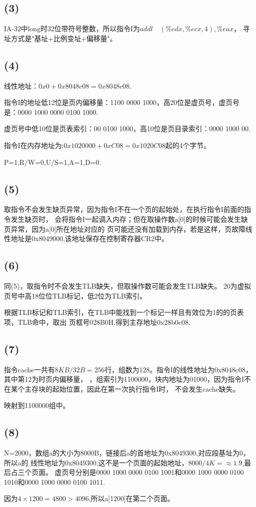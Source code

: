 \documentclass{article}
\begin{document}
\subsection*{(3)}
IA-32中long时32位带符号整数，所以指令I为$addl \quad (\%edx,\%ecx,4), \%eax$，
寻址方式是"基址+比例变址+偏移量"。
\subsection*{(4)}
线性地址：$0x0+0x8048c08=0x8048c08$.

指令I的地址低12位是页内偏移量：1100 0000 1000，高20位是虚页号，虚页号是：0000 1000 0000 0100 1000.

虚页号中低10位是页表索引：00 0100 1000，高10位是页目录索引：0000 1000 00.

指令I在内存地址为:$0x1020000+0xC08=0x1020C08$起的4个字节。

P=1,R/W=0,U/S=1,A=1,D=0.
\subsection*{(5)}
取指令不会发生缺页异常，因为指令I不在一个页的起始处，在执行指令I前面的指令发生缺页时，
会将指令I一起调入内存；但在取操作数a[0]的时候可能会发生缺页异常，因为a[0]所在地址对应的
页可能还没有加载到内存，若是这样，页故障线性地址是0x8049000,该地址保存在控制寄存器CR2中。
\subsection*{(6)}
同(5)，取指令时不会发生TLB缺失，但取操作数可能会发生TLB缺失。
20为虚拟页号中高18位位TLB标记，低2位为TLB索引。

根据TLB标记和TLB索引，在TLB中能找到一个标记一样且有效位为1的的页表项，TLB命中，取出
页框号028B0H,得到主存地址0x28b0c08.
\subsection*{(7)}
指令cache一共有$8KB/32B=256$行，组数为128。指令I的线性地址为0x8048c08，其中第12为时页内偏移量，
，组索引为1100000，块内地址为01000，因为指令I不在某个主存块的起始位置，因此在第一次执行指令I时，
不会发生cache缺失。

映射到1100000组中。
\subsection*{(8)}
N=2000，数组a的大小为8000B，链接后a的首地址为0x8049300,对应段基址为0，所以a的
线性地址为0x8049300,这不是一个页面的起始地址，$8000/4K=\approx 1.9$,最后占三个页面。
虚页号分别是0000 1000 0000 0100 1001和0000 1000 0000 0100 1010和0000 1000 0000 0100 1011.

因为$4\times 1200=4800>4096$,所以a[1200]在第二个页面。
\end{document}
